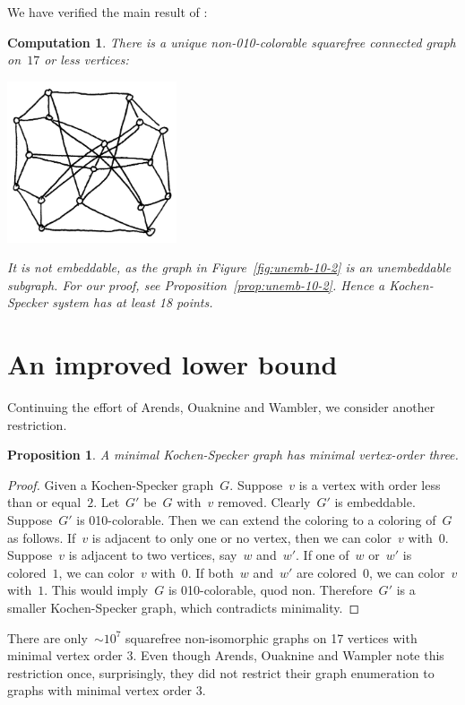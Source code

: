 \documentclass[adraft,copyright,creativecommons]{eptcs}
\newcounter{main}
\newtheorem{prop}[main]{Proposition}
\newtheorem{comp}[main]{Computation}
\theoremstyle{definition}
\theoremstyle{remark}
\begin{document}
We have verified the main result of \cite{aow11}:
\begin{comp}
There is a unique non-010-colorable squarefree connected graph on~$17$ or less
vertices:
\begin{center}
\includegraphics[width=50mm]{../graphs/c17.jpg}
\end{center}
It is not embeddable, as the graph in Figure~\ref{fig:unemb-10-2}
is an unembeddable subgraph.  For our proof,
see Proposition~\ref{prop:unemb-10-2}.
Hence a Kochen-Specker
system has at least 18 points.
\end{comp}

\section{An improved lower bound}
\label{sec:ilb}
Continuing the effort of Arends, Ouaknine and Wambler,
we consider another restriction.
\begin{prop}
    A minimal Kochen-Specker graph has minimal vertex-order three.
\end{prop}
\begin{proof}
    Given a Kochen-Specker graph~$G$.
    Suppose~$v$ is a vertex with order less than or equal~$2$.
    Let~$G'$ be~$G$ with~$v$ removed.
    Clearly~$G'$ is embeddable.
    Suppose~$G'$ is 010-colorable.
    Then we can extend the coloring to a coloring of~$G$ as follows.
    If~$v$ is adjacent to only one or no vertex,
    then we can color~$v$ with~$0$.
    Suppose~$v$ is adjacent to two vertices, say~$w$ and~$w'$.
    If one of~$w$ or~$w'$ is colored~$1$, we can color~$v$ with~$0$.
    If both~$w$ and~$w'$ are colored~$0$, we can color~$v$ with~$1$.
    This would imply~$G$ is 010-colorable, quod non.
    Therefore~$G'$ is a smaller
    Kochen-Specker graph, which contradicts minimality.
\end{proof}
There are only~${\sim}10^7$
squarefree non-isomorphic graphs on 17 vertices with minimal vertex order 3.
Even though Arends, Ouaknine and Wampler
note this restriction once,
surprisingly, they did not restrict their graph enumeration
to graphs with minimal vertex order 3.
\end{document}
